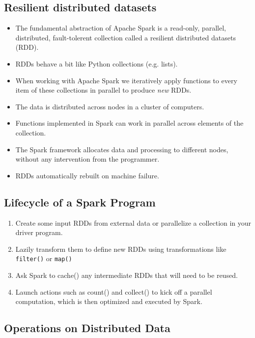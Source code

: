 \documentclass[11pt]{article}
\providecommand{\tightlist}{%
      \setlength{\itemsep}{0pt}\setlength{\parskip}{0pt}}
\begin{document}
\subsection{Resilient distributed
datasets}\label{resilient-distributed-datasets}

\begin{itemize}
\tightlist
\item
  The fundamental abstraction of Apache Spark is a read-only, parallel,
  distributed, fault-tolerent collection called a resilient distributed
  datasets (RDD).
\item
  RDDs behave a bit like Python collections (e.g. lists).
\item
  When working with Apache Spark we iteratively apply functions to every
  item of these collections in parallel to produce \emph{new} RDDs.
\item
  The data is distributed across nodes in a cluster of computers.
\item
  Functions implemented in Spark can work in parallel across elements of
  the collection.
\item
  The Spark framework allocates data and processing to different nodes,
  without any intervention from the programmer.
\item
  RDDs automatically rebuilt on machine failure.
\end{itemize}

\subsection{Lifecycle of a Spark
Program}\label{lifecycle-of-a-spark-program}

\begin{enumerate}
\def\labelenumi{\arabic{enumi}.}
\tightlist
\item
  Create some input RDDs from external data or parallelize a collection
  in your driver program.
\item
  Lazily transform them to define new RDDs using transformations like
  \texttt{filter()} or \texttt{map()}
\item
  Ask Spark to cache() any intermediate RDDs that will need to be
  reused.
\item
  Launch actions such as count() and collect() to kick off a parallel
  computation, which is then optimized and executed by Spark.
\end{enumerate}

    \subsection{Operations on Distributed
Data}\label{operations-on-distributed-data}
\end{document}
